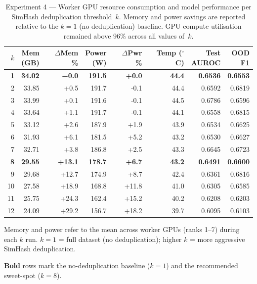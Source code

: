 \begin{table}[ht]
  \centering
  \caption{Experiment 4 --- Worker GPU resource consumption and model performance
           per SimHash deduplication threshold~$k$. Memory and power savings are
           reported relative to the $k{=}1$ (no deduplication) baseline.
           GPU compute utilisation remained above 96\% across all values of~$k$.}
  \label{tab:exp4_gpu_efficiency}
  \setlength{\tabcolsep}{6pt}
  \begin{tabular}{r r r r r r r r}
    \toprule
    $k$ & \makecell{Mem\\(GB)} & \makecell{$\Delta$Mem\\\%} & \makecell{Power\\(W)} & \makecell{$\Delta$Pwr\\\%} & \makecell{Temp\\($^\circ$C)} & \makecell{Test\\AUROC} & \makecell{OOD\\F1} \\
    \midrule
    \textbf{1} & \textbf{34.02} & \textbf{+0.0} & \textbf{191.5} & \textbf{+0.0} & \textbf{44.4} & \textbf{0.6536} & \textbf{0.6553} \\
    \midrule
    2 & 33.85 & +0.5 & 191.7 & -0.1 & 44.4 & 0.6592 & 0.6819 \\
    3 & 33.99 & +0.1 & 191.6 & -0.1 & 44.5 & 0.6786 & 0.6596 \\
    4 & 33.64 & +1.1 & 191.7 & -0.1 & 44.1 & 0.6558 & 0.6815 \\
    5 & 33.12 & +2.6 & 187.9 & +1.9 & 43.9 & 0.6534 & 0.6625 \\
    6 & 31.93 & +6.1 & 181.5 & +5.2 & 43.2 & 0.6530 & 0.6627 \\
    7 & 32.71 & +3.8 & 186.8 & +2.5 & 43.3 & 0.6645 & 0.6723 \\
    \textbf{8} & \textbf{29.55} & \textbf{+13.1} & \textbf{178.7} & \textbf{+6.7} & \textbf{43.2} & \textbf{0.6491} & \textbf{0.6600} \\
    9 & 29.68 & +12.7 & 174.9 & +8.7 & 42.4 & 0.6361 & 0.6816 \\
    10 & 27.58 & +18.9 & 168.8 & +11.8 & 41.0 & 0.6305 & 0.6585 \\
    11 & 25.75 & +24.3 & 162.4 & +15.2 & 40.2 & 0.6208 & 0.6203 \\
    12 & 24.09 & +29.2 & 156.7 & +18.2 & 39.7 & 0.6095 & 0.6103 \\
    \bottomrule
  \end{tabular}
  \begin{tablenotes}
    \small
    \item Memory and power refer to the mean across worker GPUs (ranks 1--7)
          during each $k$ run. $k{=}1$ = full dataset (no deduplication);
          higher $k$ = more aggressive SimHash deduplication.
    \item \textbf{Bold} rows mark the no-deduplication baseline ($k{=}1$)
          and the recommended sweet-spot ($k{=}8$).
  \end{tablenotes}
\end{table}
